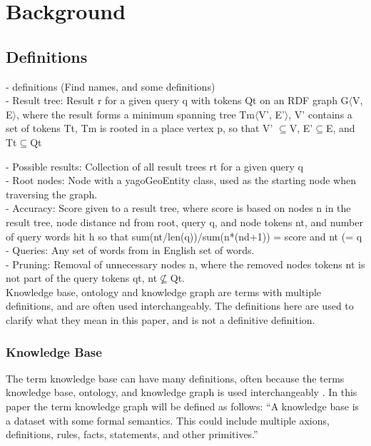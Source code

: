 
\chapter{Background}

\section{Definitions}
- definitions (Find names, and some definitions)\\
- Result tree: Result r for a given query q with tokens Qt on an RDF graph G$\langle$V, E$\rangle$, where the result forms a minimum spanning tree Tm$\langle$V', E'$\rangle$, V' contains a set of tokens Tt, Tm is rooted in a place vertex p, so that V' $\subseteq$V, E'$\subseteq$E, and Tt$\subseteq$Qt

- Possible results: Collection of all result trees rt for a given query q\\

- Root nodes: Node with a yagoGeoEntity class, used as the starting node when traversing the graph.\\

- Accuracy: Score given to a result tree, where score is based on nodes n in the result tree, node distance nd from root, query q, and node tokens nt, and number of query words hit h so that sum(nt/len(q))/sum(n*(nd+1)) = score and nt (= q\\

- Queries: Any set of words from in English set of words.\\

- Pruning: Removal of unnecessary nodes n, where the removed nodes tokens nt is not part of the query tokens qt, nt$\nsubseteq$Qt.\\


Knowledge base, ontology and knowledge graph are terms with multiple definitions, and are often used interchangeably. The definitions here are used to clarify what they mean in this paper, and is not a definitive definition.

\subsection{Knowledge Base}
The term knowledge base can have many definitions, often because the terms knowledge base, ontology, and knowledge graph is used interchangeably \cite{KGDef}. In this paper the term knowledge graph will be defined as follows: ``A knowledge base is a dataset with some formal semantics. This could include multiple axions, definitions, rules, facts, statements, and other primitives.'' \cite{davies2006semantic}

